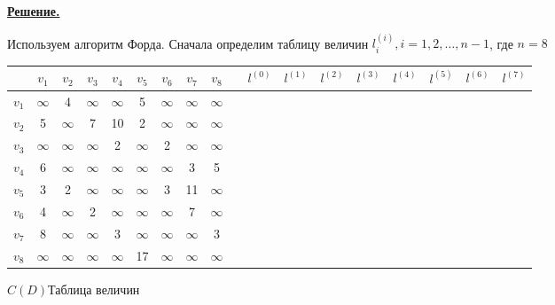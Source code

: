 \documentclass[12pt, letterpaper, titlepage]{article}
\begin{document}
\underline{\textbf{Решение.}}

Используем алгоритм Форда. Сначала определим таблицу величин $l_{i}^{(i)}, i=1,2,\dots,n-1$, где $n=8$
\begin{center}
\begin{tabular}{ | c | c | c | c | c | c | c | c | c | c |c |c |c |c |c |c |c |c |}
    \hline
    \rule{0pt}{14pt}& $v_1$ & $v_2$ & $v_3$ & $v_4$ & $v_5$ & $v_6$ & $v_7$ & $v_8$&
    &$l^{(0)}$&$l^{(1)}$&$l^{(2)}$&$l^{(3)}$&$l^{(4)}$&$l^{(5)}$&$l^{(6)}$&$l^{(7)}$\\
    \hline
    $v_1$& $\infty$ & 4 & $\infty$ & $\infty$  & 5 & $\infty$  & $\infty$  & $\infty$&
    &\\
    \hline
    $v_2$& 5 & $\infty$  & 7 & 10 & 2 & $\infty$ & $\infty$ & $\infty$&
    &\\
    \hline
    $v_3$& $\infty$  & $\infty$  & $\infty$ & 2 & $\infty$ & 2 & $\infty$ & $\infty$&
    &\\
    \hline
    $v_4$& 6 & $\infty$ & $\infty$ & $\infty$ & $\infty$ & $\infty$ & 3 & 5&
    &\\
    \hline
    $v_5$& 3 & 2 & $\infty$ & $\infty$ & $\infty$ & 3 & 11 & $\infty$&
    &\\
    \hline
    $v_6$& 4 & $\infty$ & 2 & $\infty$ & $\infty$ & $\infty$ & 7 & $\infty$&
    &\\
    \hline
    $v_7$& 8 & $\infty$ & $\infty$ & 3 & $\infty$ & $\infty$ & $\infty$ & 3&
    &\\
    \hline
    $v_8$& $\infty$ & $\infty$ & $\infty$ & $\infty$ & 17 & $\infty$ & $\infty$ & $\infty$&
    &\\
    \hline
\end{tabular}
\end{center}
\hspace{3.5cm}$C(D)$\hspace{6.5cm}Таблица величин
\end{document}
